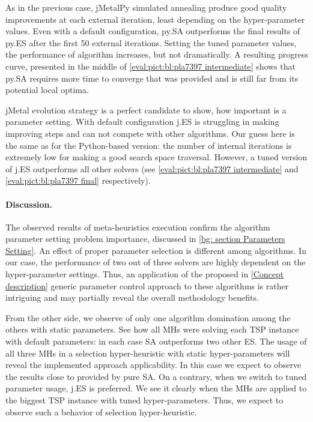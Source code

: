 As in the previous case, jMetalPy simulated annealing produce good quality improvements at each external iteration, least depending on the hyper-parameter values. Even with a default configuration, py.SA outperforms the final results of py.ES after the first 50 external iterations. Setting the tuned parameter values, the performance of algorithm increases, but not dramatically. A resulting progress curve, presented in the middle of \cref{eval:pict:bl:pla7397 intermediate} shows that py.SA requires more time to converge that was provided and is still far from its potential local optima.

jMetal evolution strategy is a perfect candidate to show, how important is a parameter setting. With default configuration j.ES is struggling in making improving steps and can not compete with other algorithms. Our guess here is the same as for the Python-based version: the number of internal iterations is extremely low for making a good search space traversal. However, a tuned version of j.ES outperforms all other solvers (see \cref{eval:pict:bl:pla7397 intermediate} and \cref{eval:pict:bl:pla7397 final} respectively).


\paragraph{Discussion.} The observed results of meta-heuristics execution confirm the algorithm parameter setting problem importance, discussed in \cref{bg: section Parameters Setting}. An effect of proper parameter selection is different among algorithms. In our case, the performance of two out of three solvers are highly dependent on the hyper-parameter settings. Thus, an application of the proposed in \cref{Concept description} generic parameter control approach to these algorithms is rather intriguing and may partially reveal the overall methodology benefits.

From the other side, we observe of only one algorithm domination among the others with static parameters. See how all MHs were solving each TSP instance with default parameters: in each case SA outperforms two other ES. The usage of all three MHs in a selection hyper-heuristic with static hyper-parameters will reveal the implemented approach applicability. In this case we expect to observe the results close to provided by pure SA. On a contrary, when we switch to tuned parameter usage, j.ES is preferred. We see it clearly when the MHs are applied to the biggest TSP instance with tuned hyper-parameters. Thus, we expect to observe such a behavior of selection hyper-heuristic.

